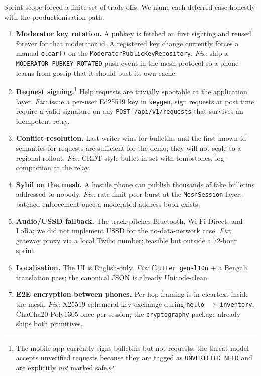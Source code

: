 \documentclass[11pt,a4paper]{article}
\begin{document}
Sprint scope forced a finite set of trade-offs. We name each deferred
case honestly with the productionisation path:

\begin{enumerate}[leftmargin=*,label=\textbf{C\arabic*.}]
\item \textbf{Moderator key rotation.} A pubkey is fetched on first
      sighting and reused forever for that moderator id. A registered
      key change currently forces a manual \texttt{clear()} on the
      \texttt{Moderator}\allowbreak\texttt{PublicKey}\allowbreak\texttt{Repository}. \emph{Fix:} ship a
      \texttt{MODERATOR\_PUBKEY\_ROTATED} push event in the mesh
      protocol so a phone learns from gossip that it should bust its
      own cache.
\item \textbf{Request signing.}\footnote{The mobile app currently signs
      bulletins but not requests; the threat model accepts unverified
      requests because they are tagged as \texttt{UNVERIFIED NEED} and
      are explicitly \emph{not} marked safe.} Help requests are
      trivially spoofable at the application layer. \emph{Fix:} issue
      a per-user Ed25519 key in \texttt{keygen}, sign requests at
      post time, require a valid signature on any
      \texttt{POST /api/v1/requests} that survives an idempotent
      retry.
\item \textbf{Conflict resolution.} Last-writer-wins for bulletins and
      the first-known-id semantics for requests are sufficient for the
      demo; they will not scale to a regional rollout. \emph{Fix:}
      CRDT-style bullet-in set with tombstones, log-compaction at the
      relay.
\item \textbf{Sybil on the mesh.} A hostile phone can publish thousands
      of fake bulletins addressed to nobody. \emph{Fix:} rate-limit
      peer burst at the \texttt{MeshSession} layer; batched
      enforcement once a moderated-address book exists.
\item \textbf{Audio/USSD fallback.} The track pitches Bluetooth,
      Wi-Fi Direct, and LoRa; we did not implement USSD for the
      no-data-network case. \emph{Fix:} gateway proxy via a local
      Twilio number; feasible but outside a 72-hour sprint.
\item \textbf{Localisation.} The UI is English-only. \emph{Fix:}
      \texttt{flutter gen-l10n} + a Bengali translation pass; the
      canonical JSON is already Unicode-clean.
\item \textbf{E2E encryption between phones.} Per-hop framing is in
      cleartext inside the mesh. \emph{Fix:} X25519 ephemeral
      key exchange during \texttt{hello} $\to$ \texttt{inventory},
      ChaCha20-Poly1305 once per session; the
      \texttt{cryptography} package already ships both primitives.
\end{enumerate}
\end{document}
